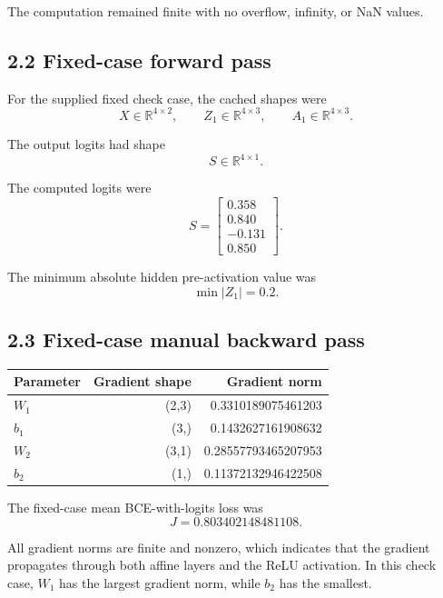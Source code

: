 \documentclass[11pt]{article}
\begin{document}
The computation remained finite with no overflow, infinity, or NaN values.
\subsection*{2.2 Fixed-case forward pass}
For the supplied fixed check case, the cached shapes were
      \[
        X \in \mathbb{R}^{4\times 2},
        \qquad
        Z_1 \in \mathbb{R}^{4\times 3},
        \qquad
        A_1 \in \mathbb{R}^{4\times 3}.
      \]

The output logits had shape
      \[
        S \in \mathbb{R}^{4\times 1}.
      \]

The computed logits were
      \[
        S =
        \begin{bmatrix}
        0.358 \\
        0.840 \\
        -0.131 \\
        0.850
        \end{bmatrix}.
      \]

The minimum absolute hidden pre-activation value was
      \[
        \min |Z_1| = 0.2.
      \]

\subsection*{2.3 Fixed-case manual backward pass}
\begin{center}
  \begin{tabular}{lrr}
    \toprule
    Parameter & Gradient shape & Gradient norm \\
    \midrule
    $W_1$ & (2,3) & 0.3310189075461203 \\
    $b_1$ & (3,) & 0.1432627161908632 \\
    $W_2$ & (3,1) & 0.28557793465207953 \\
    $b_2$ & (1,) & 0.11372132946422508 \\
    \bottomrule
  \end{tabular}
\end{center}

The fixed-case mean BCE-with-logits loss was
      \[
        J = 0.803402148481108.
      \]

All gradient norms are finite and nonzero, which indicates that the gradient
propagates through both affine layers and the ReLU activation. In this check
case, $W_1$ has the largest gradient norm, while $b_2$ has the smallest.
\end{document}
